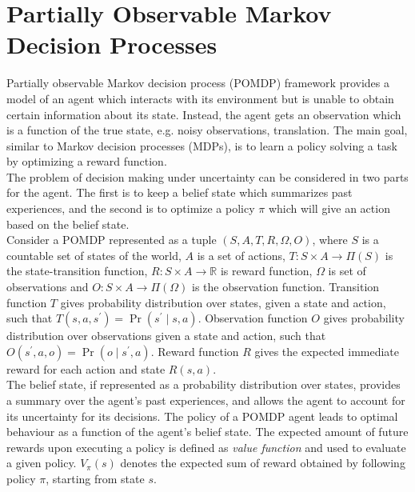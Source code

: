 \section{Partially Observable Markov Decision Processes}
\label{sec:belief_POMDP}
Partially observable Markov decision process (POMDP) framework provides a model of an agent which interacts with its environment but is unable to obtain certain information about its state. Instead, the agent gets an observation which is a function of the true state, e.g. noisy observations, translation. The main goal, similar to Markov decision processes (MDPs), is to learn a policy solving a task by optimizing a reward function. \\
The problem of decision making under uncertainty can be considered in two parts for the agent. The first is to keep a belief state which summarizes past experiences, and the second is to optimize a policy $ \pi $ which will give an action based on the belief state. \cite{KAELBLING199899,Murphy2000}\\
Consider a POMDP represented as a tuple $ (S, A, T, R, \Omega, O) $, where $ S $ is a countable set of states of the world, $ A $ is a set of actions, $ T: S \times A \rightarrow \varPi(S) $ is the state-transition function, $ R: S\times A \rightarrow \mathbb{R} $ is reward function, $ \Omega $ is set of observations and $ O:S\times A \rightarrow \varPi(\Omega)$ is the observation function. Transition function $ T $ gives probability distribution over states, given a state and action, such that $ T(s, a, s^\prime) = \operatorname{Pr}(s^\prime \mid s, a) $. Observation function $ O $ gives probability distribution over observations given a state and action, such that $ O(s^\prime, a, o) = \operatorname{Pr}(o \mid s^\prime, a) $. Reward function $ R $ gives the expected immediate reward for each action and state $ R(s,a) $.\\
The belief state, if represented as a probability distribution over states, provides a summary over the agent's past experiences, and allows the agent to account for its uncertainty for its decisions. The policy of a POMDP agent leads to optimal behaviour as a function of the agent's belief state. %
The expected amount of future rewards upon executing a policy is defined as \textit{value function} and used to evaluate a given policy. $ V_\pi(s) $ denotes the expected sum of reward obtained by following policy $ \pi $, starting from state $ s $.\\
